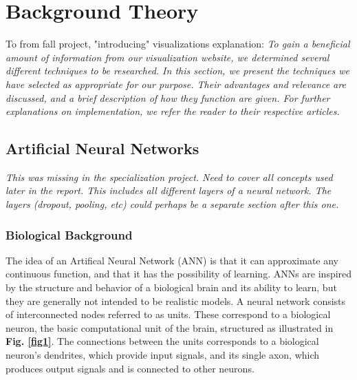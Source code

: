 
\chapter{Background Theory}

To from fall project, "introducing" visualizations explanation:
\noindent \textit{To gain a beneficial amount of information from our visualization website, we determined several different techniques to be researched. In this section, we present the techniques we have selected as appropriate for our purpose. Their advantages and relevance are discussed, and a brief description of how they function are given. For further explanations on implementation, we refer the reader to their respective articles.}

\section{Artificial Neural Networks}

\textit{This was missing in the specialization project. Need to cover all concepts used later in the report. This includes all different layers of a neural network. The layers (dropout, pooling, etc) could perhaps be a separate section after this one.}

\subsection{Biological Background}

The idea of an Artifical Neural Network (ANN) is that it can approximate any continuous function, and that it has the possibility of learning. ANNs are inspired by the structure and behavior of a biological brain and its ability to learn, but they are generally not intended to be realistic models. A neural network consists of interconnected nodes referred to as units. These correspond to a biological neuron, the basic computational unit of the brain, structured as illustrated in \textbf{Fig. \ref{fig1}}. The connections between the units corresponds to a biological neuron's dendrites, which provide input signals, and its single axon, which produces output signals and is connected to other neurons. \\

